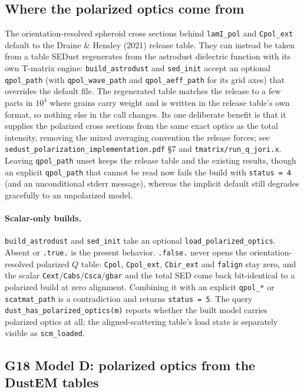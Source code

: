 \documentclass{my_memo}
\newcommand{\code}[1]{\texttt{#1}}
\begin{document}
\subsection{Where the polarized optics come from}\label{sec:pol:source}

The orientation-resolved spheroid cross sections behind \code{lamI\_pol} and
\code{Cpol\_ext} default to the Draine \& Hensley (2021) release table. They can
instead be taken from a table SEDust regenerates from the astrodust dielectric
function with its own T-matrix engine: \code{build\_astrodust} and \code{sed\_init}
accept an optional \code{qpol\_path} (with \code{qpol\_wave\_path} and
\code{qpol\_aeff\_path} for its grid axes) that overrides the default file. The
regenerated table matches the release to a few parts in $10^4$ where grains carry
weight and is written in the release table's own format, so nothing else in the
call changes. Its
one deliberate benefit is that it supplies the polarized cross sections from the
same exact optics as the total intensity, removing the mixed averaging convention
the release forces; see \code{sedust\_polarization\_implementation.pdf} \S7 and
\code{tmatrix/run\_q\_jori.x}. Leaving \code{qpol\_path} unset keeps the release
table and the existing results, though an explicit \code{qpol\_path} that cannot
be read now fails the build with \code{status = 4} (and an unconditional stderr
message), whereas the implicit default still degrades gracefully to an unpolarized
model.

\paragraph{Scalar-only builds.} \code{build\_astrodust} and \code{sed\_init} take
an optional \code{load\_polarized\_optics}. Absent or \code{.true.} is the present
behavior. \code{.false.} never opens the orientation-resolved polarized $Q$ table:
\code{Cpol}, \code{Cpol\_ext}, \code{Cbir\_ext} and \code{falign} stay zero, and
the scalar \code{Cext}/\code{Cabs}/\code{Csca}/\code{gbar} and the total SED come
back bit-identical to a polarized build at zero alignment. Combining it with an
explicit \code{qpol\_*} or \code{scatmat\_path} is a contradiction and returns
\code{status = 5}. The query \code{dust\_has\_polarized\_optics(m)} reports whether
the built model carries polarized optics at all; the aligned-scattering table's
load state is separately visible as \code{scm\_loaded}.

\subsection{G18 Model D: polarized optics from the DustEM
tables}\label{sec:g18d-pol}
\end{document}
